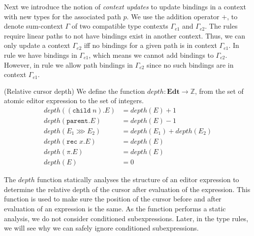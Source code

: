 Next we introduce the notion of \textit{context updates} to update bindings in a context with new types for the associated path $p$. We use the addition operator $+$, to denote sum-context $\Gamma$ of two compatible type contexts $\Gamma_{e1}$ and $\Gamma_{e2}$. The rules require linear paths to not have bindings exist in another context. Thus, we can only update a context $\Gamma_{e2}$ iff no bindings for a given path is in context $\Gamma_{e1}$. In rule  we have bindings in $\Gamma_{e1}$, which means we cannot add bindings to $\Gamma_{e2}$. However, in rule  we allow path bindings in $\Gamma_{e2}$ since no such bindings are in context $\Gamma_{e1}$.


\begin{definition}{(Relative cursor depth)}
    We define the function $depth : \mathbf{Edt} \rightarrow \mathbb{Z}$, from the set of atomic editor expression to the set of integers.
    \begin{align*}
    depth((\texttt{child}\; n).E) &= depth(E) + 1 \\
    depth(\texttt{parent}.E) &= depth(E) - 1 \\
    depth(E_1 \ggg E_2) &= depth(E_1) + depth(E_2) \\
    depth(\texttt{rec}\; x.E) &= depth(E) \\
    depth(\pi.E) &= depth(E) \\
    depth(E) &= 0 
\end{align*}
\end{definition}
The $depth$ function statically analyses the structure of an editor expression to determine the relative depth of the cursor after evaluation of the expression. This function is used to make sure the position of the cursor before and after evaluation of an expression is the same. As the function performs a static analysis, we do not consider conditioned subexpressions. Later, in the type rules, we will see why we can safely ignore conditioned subexpressions. \\



